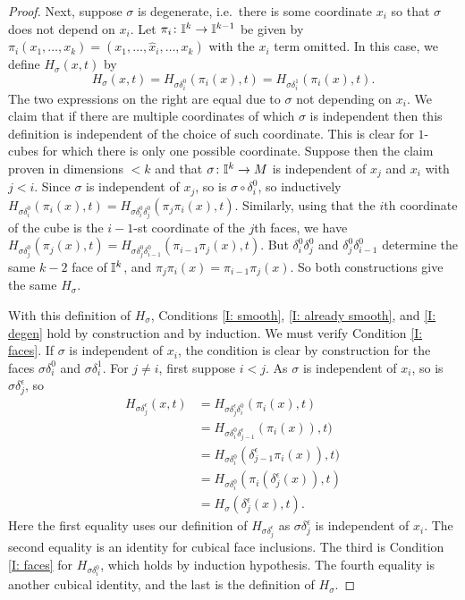 \begin{proof}
	Next, suppose $\sigma$ is degenerate, i.e.\ there is some coordinate $x_i$ so that $\sigma$ does not depend on $x_i$.
	Let $\pi_i \colon \mathbb{I}^k\to\mathbb{I}^{k-1}$ be given by $\pi_i(x_1,\ldots, x_k) = (x_1,\ldots, \hat x_i, \ldots, x_k)$ with the $x_i$ term omitted.
	In this case, we define $H_\sigma(x,t)$ by
	\[H_\sigma(x,t) = H_{\sigma \delta_i^0}(\pi_i(x),t) = H_{\sigma \delta_i^1}(\pi_i(x),t).\]
	The two expressions on the right are equal due to $\sigma$ not depending on $x_i$.
	We claim that if there are multiple coordinates of which $\sigma$ is independent then this definition is independent of the choice of such coordinate.
	This is clear for $1$-cubes for which there is only one possible coordinate.
	Suppose then the claim proven in dimensions $<k$ and that $\sigma \colon \mathbb{I}^k \to M$ is independent of $x_j$ and $x_i$ with $j<i$.
	Since $\sigma$ is independent of $x_j$, so is $\sigma \circ \delta_i^0$, so inductively $H_{\sigma \delta_i^0}(\pi_i(x),t) = H_{\sigma \delta_i^0\delta_j^0}(\pi_j\pi_i(x),t)$.
	Similarly, using that the $i$th coordinate of the cube is the $i-1$-st coordinate of the $j$th faces, we have $H_{\sigma \delta_j^0}(\pi_j(x),t) = H_{\sigma \delta_j^0\delta_{i-1}^0}(\pi_{i-1}\pi_j(x),t)$.
	But $\delta_i^0\delta_j^0$ and $\delta_j^0\delta_{i-1}^0$ determine the same $k-2$ face of $\mathbb{I}^k$, and $\pi_j\pi_i(x) = \pi_{i-1}\pi_j(x)$.
	So both constructions give the same $H_\sigma$.

	With this definition of $H_\sigma$, Conditions \eqref{I: smooth}, \eqref{I: already smooth}, and \eqref{I: degen} hold by construction and by induction.
	We must verify Condition \eqref{I: faces}.
	If $\sigma$ is independent of $x_i$, the condition is clear by construction for the faces $\sigma\delta_i^0$ and $\sigma\delta_i^1$.
	For $j\neq i$, first suppose $i<j$.
	As $\sigma$ is independent of $x_i$, so is $\sigma\delta_j^\epsilon$, so
	\begin{align*}
		H_{\sigma\delta_j^\epsilon}(x,t)& = H_{\sigma\delta_j^\epsilon \delta_i^0}(\pi_i(x),t)\\
		& = H_{\sigma \delta_i^0\delta_{j-1}^\epsilon}(\pi_i(x)),t)\\
		& = H_{\sigma \delta_i^0}(\delta_{j-1}^\epsilon\pi_i(x)),t)\\
		& = H_{\sigma \delta_i^0}(\pi_i(\delta_j^\epsilon(x)),t)\\
		& = H_\sigma(\delta_j^\epsilon(x),t).
	\end{align*}
	Here the first equality uses our definition of $H_{\sigma\delta_j^\epsilon}$ as $\sigma\delta_j^\epsilon$ is independent of $x_i$.
	The second equality is an identity for cubical face inclusions.
	The third is Condition \eqref{I: faces} for $H_{\sigma \delta_i^0}$, which holds by induction hypothesis.
	The fourth equality is another cubical identity, and the last is the definition of $H_\sigma$.


\end{proof}
